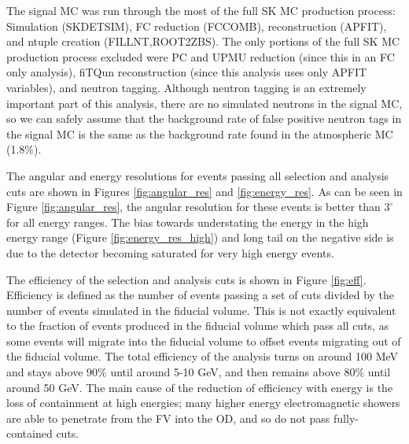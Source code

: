 The signal MC was run through the most of the full SK MC production process: Simulation (SKDETSIM), FC reduction (FCCOMB), reconstruction (APFIT), and ntuple creation (FILLNT,ROOT2ZBS).  The only portions of the full SK MC production process excluded were PC and UPMU reduction (since this in an FC only analysis), fiTQun reconstruction (since this analysis uses only APFIT variables), and neutron tagging.  Although neutron tagging is an extremely important part of this analysis, there are no simulated neutrons in the signal MC, so we can safely assume that the background rate of false positive neutron tags in the signal MC is the same as the background rate found in the atmospheric MC (1.8\%).

The angular and energy resolutions for events passing all selection and analysis cuts are shown in Figures \ref{fig:angular_res} and \ref{fig:energy_res}.  As can be seen in Figure \ref{fig:angular_res}, the angular resolution for these events is better than $3^\circ$ for all energy ranges.  The bias towards understating the energy in the high energy range (Figure \ref{fig:energy_res_high}) and long tail on the negative side is due to the detector becoming saturated for very high energy events.

The efficiency of the selection and analysis cuts is shown in Figure \ref{fig:eff}.  Efficiency is defined as the number of events passing a set of cuts divided by the number of events simulated in the fiducial volume.  This is not exactly equivalent to the fraction of events produced in the fiducial volume which pass all cuts, as some events will migrate into the fiducial volume to offset events migrating out of the fiducial volume.  The total efficiency of the analysis turns on around 100 MeV and stays above $90\%$ until around 5-10 GeV, and then remains above $80\%$ until around 50 GeV.  The main cause of the reduction of efficiency with energy is the loss of containment at high energies; many higher energy electromagnetic showers are able to penetrate from the FV into the OD, and so do not pass fully-contained cuts.

